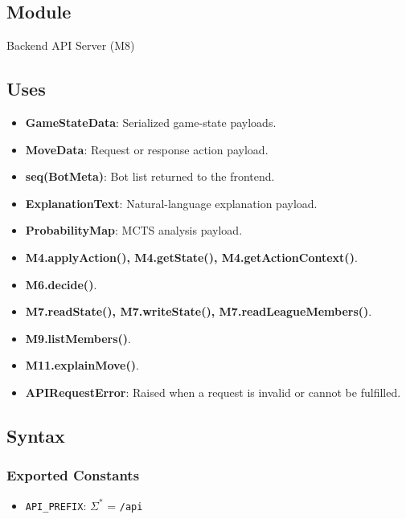 \documentclass[12pt, titlepage]{article}
\begin{document}
\subsection{Module}
Backend API Server (M8)

\subsection{Uses}
\begin{itemize}
    \item \textbf{GameStateData}: Serialized game-state payloads.
    \item \textbf{MoveData}: Request or response action payload.
    \item \textbf{seq(BotMeta)}: Bot list returned to the frontend.
    \item \textbf{ExplanationText}: Natural-language explanation payload.
    \item \textbf{ProbabilityMap}: MCTS analysis payload.
    \item \textbf{M4.applyAction(), M4.getState(), M4.getActionContext()}.
    \item \textbf{M6.decide()}.
    \item \textbf{M7.readState(), M7.writeState(), M7.readLeagueMembers()}.
    \item \textbf{M9.listMembers()}.
    \item \textbf{M11.explainMove()}.
    \item \textbf{APIRequestError}: Raised when a request is invalid or cannot be fulfilled.
\end{itemize}

\subsection{Syntax}

\subsubsection{Exported Constants}
\begin{itemize}
\item \texttt{API\_PREFIX}: $\Sigma^{*}$ = \texttt{/api}
\end{itemize}
\end{document}
